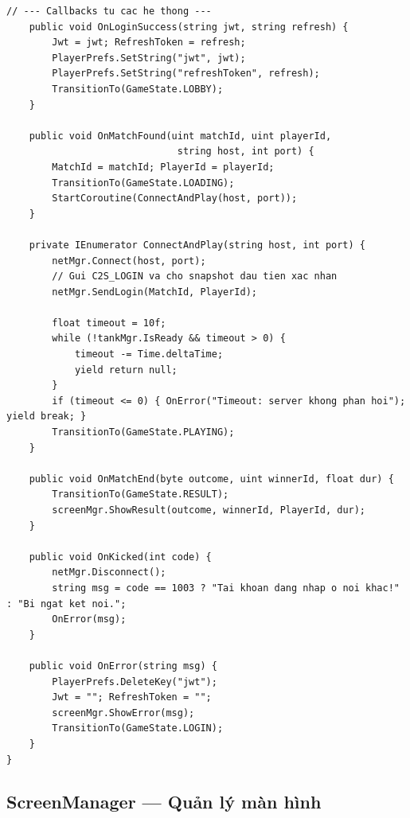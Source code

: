 \documentclass[12pt,a4paper]{report}
\begin{document}
\begin{lstlisting}[style=bashStyle, caption={GameManager --- state machine đầy đủ bằng C\#}, label={lst:gamestates}]
    // --- Callbacks tu cac he thong ---
    public void OnLoginSuccess(string jwt, string refresh) {
        Jwt = jwt; RefreshToken = refresh;
        PlayerPrefs.SetString("jwt", jwt);
        PlayerPrefs.SetString("refreshToken", refresh);
        TransitionTo(GameState.LOBBY);
    }

    public void OnMatchFound(uint matchId, uint playerId,
                              string host, int port) {
        MatchId = matchId; PlayerId = playerId;
        TransitionTo(GameState.LOADING);
        StartCoroutine(ConnectAndPlay(host, port));
    }

    private IEnumerator ConnectAndPlay(string host, int port) {
        netMgr.Connect(host, port);
        // Gui C2S_LOGIN va cho snapshot dau tien xac nhan
        netMgr.SendLogin(MatchId, PlayerId);

        float timeout = 10f;
        while (!tankMgr.IsReady && timeout > 0) {
            timeout -= Time.deltaTime;
            yield return null;
        }
        if (timeout <= 0) { OnError("Timeout: server khong phan hoi"); yield break; }
        TransitionTo(GameState.PLAYING);
    }

    public void OnMatchEnd(byte outcome, uint winnerId, float dur) {
        TransitionTo(GameState.RESULT);
        screenMgr.ShowResult(outcome, winnerId, PlayerId, dur);
    }

    public void OnKicked(int code) {
        netMgr.Disconnect();
        string msg = code == 1003 ? "Tai khoan dang nhap o noi khac!" : "Bi ngat ket noi.";
        OnError(msg);
    }

    public void OnError(string msg) {
        PlayerPrefs.DeleteKey("jwt");
        Jwt = ""; RefreshToken = "";
        screenMgr.ShowError(msg);
        TransitionTo(GameState.LOGIN);
    }
}
\end{lstlisting}

\subsection{ScreenManager --- Quản lý màn hình}
\end{document}

